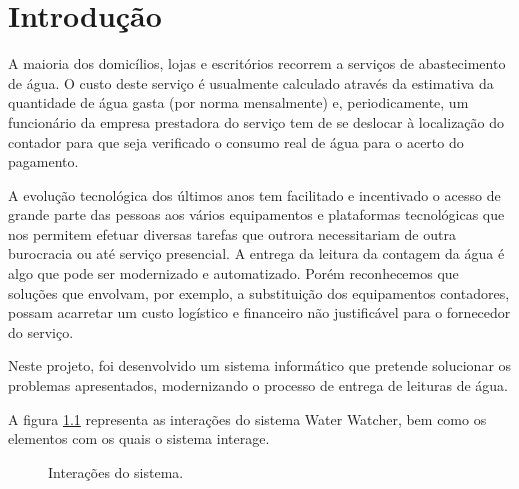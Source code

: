 %
%
\chapter{Introdução} \label{cap:intro}

A maioria dos domicílios, lojas e escritórios recorrem a serviços de abastecimento de água. O custo deste serviço é usualmente calculado através da estimativa da quantidade de água gasta (por norma mensalmente) e, periodicamente, um funcionário da empresa prestadora do serviço tem de se deslocar à localização do contador para que seja verificado o consumo real de água para o acerto do pagamento.\par
A evolução tecnológica dos últimos anos tem facilitado e incentivado o acesso de grande parte das pessoas aos vários equipamentos e plataformas tecnológicas que nos permitem efetuar diversas tarefas que outrora necessitariam de outra burocracia ou até serviço presencial. A entrega da leitura da contagem da água é algo que pode ser modernizado e automatizado. Porém reconhecemos que soluções que envolvam, por exemplo, a substituição dos equipamentos contadores, possam acarretar um custo logístico e financeiro não justificável para o fornecedor do serviço. \par
Neste projeto, foi desenvolvido um sistema informático que pretende solucionar os problemas apresentados, modernizando o processo de entrega de leituras de água. \par
A figura \ref{fig:interacoes}  representa as interações do sistema Water Watcher, bem como os elementos com os quais o sistema interage.

\begin{figure}[h!]
\begin{center}
\caption{Interações do sistema.}
\label{fig:interacoes}
\end{center}
\end{figure}

